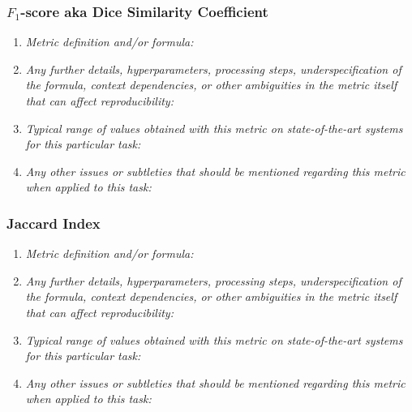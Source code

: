 \documentclass[a4paper,11pt]{article}
\begin{document}
        \subsubsection{$F_1$-score aka Dice Similarity Coefficient}
            \begin{enumerate}[label=\alph*.]
                \item \textit{Metric definition and/or formula:}
                \bigskip
                \item \textit{Any further details, hyperparameters, processing steps, underspecification of the formula, context dependencies, or other ambiguities in the metric itself that can affect reproducibility:}
                \bigskip
                \item \textit{Typical range of values obtained with this metric on state-of-the-art systems for this particular task:}
                \bigskip
                \item \textit{Any other issues or subtleties that should be mentioned regarding this metric when applied to this task:}
                \bigskip
            \end{enumerate}
        \subsubsection{Jaccard Index}
            \begin{enumerate}[label=\alph*.]
                \item \textit{Metric definition and/or formula:}
                \bigskip
                \item \textit{Any further details, hyperparameters, processing steps, underspecification of the formula, context dependencies, or other ambiguities in the metric itself that can affect reproducibility:}
                \bigskip
                \item \textit{Typical range of values obtained with this metric on state-of-the-art systems for this particular task:}
                \bigskip
                \item \textit{Any other issues or subtleties that should be mentioned regarding this metric when applied to this task:}
                \bigskip
            \end{enumerate}
\end{document}
